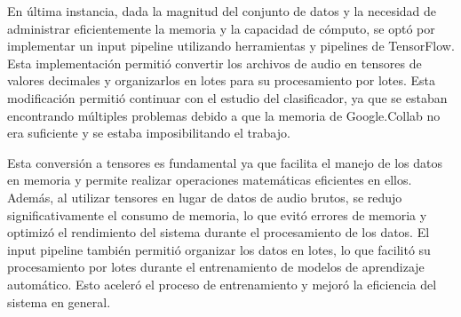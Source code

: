 En última instancia, dada la magnitud del conjunto de datos y la necesidad de administrar eficientemente la memoria y la capacidad de cómputo, se optó por implementar un input pipeline utilizando herramientas y pipelines de TensorFlow. Esta implementación permitió convertir los archivos de audio en tensores de valores decimales y organizarlos en lotes para su procesamiento por lotes. Esta modificación permitió continuar con el estudio del clasificador, ya que se estaban encontrando múltiples problemas debido a que la memoria de Google.Collab no era suficiente y se estaba imposibilitando el trabajo.

Esta conversión a tensores es fundamental ya que facilita el manejo de los datos en memoria y permite realizar operaciones matemáticas eficientes en ellos. Además, al utilizar tensores en lugar de datos de audio brutos, se redujo significativamente el consumo de memoria, lo que evitó errores de memoria y optimizó el rendimiento del sistema durante el procesamiento de los datos.  El input pipeline también permitió organizar los datos en lotes, lo que facilitó su procesamiento por lotes durante el entrenamiento de modelos de aprendizaje automático. Esto aceleró el proceso de entrenamiento y mejoró la eficiencia del sistema en general. 

